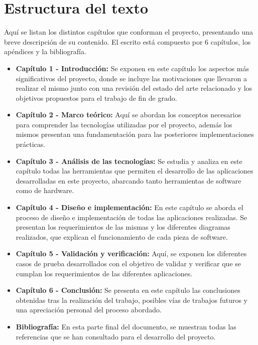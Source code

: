 \section{Estructura del texto}

Aquí se listan los distintos capítulos que conforman el proyecto, presentando una breve descripción de su contenido. El escrito está compuesto por 6 capítulos, los apéndices y la bibliografía.


\begin{itemize}   
    \item \textbf{Capítulo 1 - Introducción:} Se exponen en este capítulo los aspectos más significativos del proyecto, donde se incluye las motivaciones que llevaron a realizar el mismo junto con una revisión del estado del arte relacionado y los objetivos propuestos para el trabajo de fin de grado.

    \item \textbf{Capítulo 2 - Marco teórico:} Aquí se abordan los conceptos necesarios para comprender las tecnologías utilizadas por el proyecto, además los mismos presentan una fundamentación para las posteriores implementaciones prácticas.

    \item \textbf{Capítulo 3 - Análisis de las tecnologías:} Se estudia y analiza en este capítulo todas las herramientas que permiten el desarrollo de las aplicaciones desarrolladas en este proyecto, abarcando tanto herramientas de software como de hardware.

    \item \textbf{Capítulo 4 - Diseño e implementación:} En este capítulo se aborda el proceso de diseño e implementación de todas las aplicaciones realizadas. Se presentan los requerimientos de las mismas y los diferentes diagramas realizados, que explican el funcionamiento de cada pieza de software. 

    \item \textbf{Capítulo 5 - Validación y verificación:} Aquí, se exponen los diferentes casos de prueba desarrollados con el objetivo de validar y verificar que se cumplan los requerimientos de las diferentes aplicaciones.

    \item \textbf{Capítulo 6 - Conclusión:} Se presenta en este capítulo las conclusiones obtenidas tras la realización del trabajo, posibles vías de trabajos futuros y una apreciación personal del proceso abordado.
    
    
    \item \textbf{Bibliografía:} En esta parte final del documento, se muestran todas las referencias que se han consultado para el desarrollo del proyecto.   
\end{itemize}

